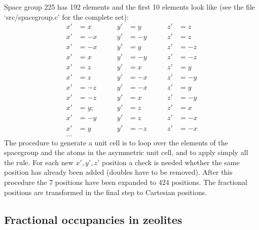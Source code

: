 Space group 225 has 192 elements and the first 10 elements look like (see the file `src/spacegroup.c' for the complete set):
\begin{align*}
  x'&=x  \qquad &y'&=y   \qquad &z'&=z\\
  x'&=-x \qquad &y'&=-y  \qquad &z'&=z\\
  x'&=-x \qquad &y'&=y   \qquad &z'&=-z\\
  x'&=x  \qquad &y'&=-y  \qquad &z'&=-z\\
  x'&=z  \qquad &y'&=x   \qquad &z'&=y\\
  x'&=z  \qquad &y'&=-x  \qquad &z'&=-y\\
  x'&=-z \qquad &y'&=-x  \qquad &z'&=y\\
  x'&=-z \qquad &y'&=x   \qquad &z'&=-y\\
  x'&=y; \qquad &y'&=z   \qquad &z'&=x\\
  x'&=-y \qquad &y'&=z   \qquad &z'&=-x\\
  x'&=y  \qquad &y'&=-z  \qquad &z'&=-x\\
  \dots
\end{align*}
The procedure to generate a unit cell is to loop over the elements of the spacegroup and the atoms in the asymmetric unit cell, and to
apply simply all the rule. For each new $x',y',z'$ position a check is needed whether the same position has already been added
(doubles have to be removed). After this procedure the 7 positions have been expanded to 424 positions. The fractional positions
are transformed in the final step to Cartesian positions.



\subsection{Fractional occupancies in zeolites}


